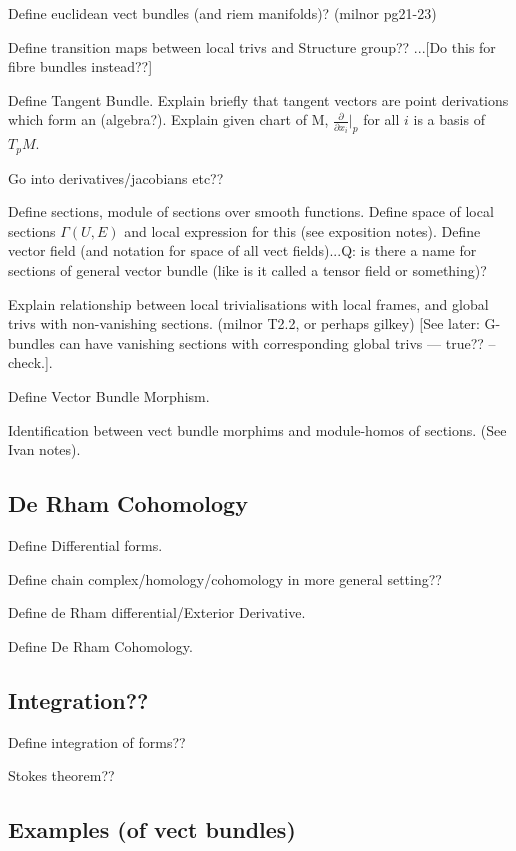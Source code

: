 \documentclass[a4paper]{article}
\theoremstyle{definition} \newtheorem*{definition}{Definition}
\theoremstyle{definition} \newtheorem*{definitions}{Definitions}
\theoremstyle{plain} \newtheorem{theorem}{Theorem}[section]
\theoremstyle{plain} \newtheorem{proposition}[theorem]{Proposition}
\theoremstyle{plain} \newtheorem{corollary}[theorem]{Corollary}
\theoremstyle{plain} \newtheorem{lemma}[theorem]{Lemma}
\theoremstyle{plain} \newtheorem{example}[theorem]{Example}
\begin{document}
Define euclidean vect bundles (and riem manifolds)? (milnor pg21-23)

Define transition maps between local trivs and Structure group?? ...[Do this for fibre bundles instead??]

Define Tangent Bundle. 
Explain briefly that tangent vectors are point derivations which form an (algebra?).
Explain given chart of M, $\frac{\partial}{\partial{x_i}} |_p$ for all $i$ is a basis of $T_p M$.

Go into derivatives/jacobians etc??

Define sections, module of sections over smooth functions. Define space of local sections $\Gamma (U, E)$ and local expression for this (see exposition notes).
Define vector field (and notation for space of all vect fields)...Q: is there a name for sections of general vector bundle (like is it called a tensor field or something)?

Explain relationship between local trivialisations with local frames, and global trivs with non-vanishing sections. (milnor T2.2, or perhaps gilkey)
[See later: G-bundles can have vanishing sections with corresponding global trivs --- true?? --check.]. 

Define Vector Bundle Morphism.

Identification between vect bundle morphims and module-homos of sections. (See Ivan notes).

\subsection{De Rham Cohomology}

Define Differential forms.

Define chain complex/homology/cohomology in more general setting??

Define de Rham differential/Exterior Derivative.

Define De Rham Cohomology.

\subsection{Integration??}

Define integration of forms??

Stokes theorem??

\subsection{Examples (of vect bundles)}
\end{document}
